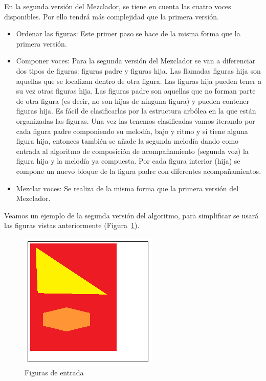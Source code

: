 En la segunda versión del Mezclador, se tiene en cuenta las cuatro voces disponibles. Por ello tendrá más complejidad que la primera versión.

\begin{itemize}
	\item Ordenar las figuras: Este primer paso se hace de la misma forma que la primera versión.

	\item Componer voces: Para la segunda versión del Mezclador se van a diferenciar dos tipos de figuras: figuras padre y figuras hija. Las llamadas figuras hija son aquellas que se localizan dentro de otra figura. Las figuras hija pueden tener a su vez otras figuras hija. Las figuras padre son aquellas que no forman parte de otra figura (es decir, no son hijas de ninguna figura) y pueden contener figuras hija. Es fácil de clasificarlas por la estructura arbólea en la que están organizadas las figuras.
Una vez las tenemos clasificadas vamos iterando por cada figura padre componiendo su melodía, bajo y ritmo y si tiene alguna figura hija, entonces también se añade la segunda melodía dando como entrada al algoritmo de composición de acompañamiento (segunda voz) la figura hija y la melodía ya compuesta. Por cada figura interior (hija) se compone un nuevo bloque de la figura padre con diferentes acompañamientos.

	\item Mezclar voces: Se realiza de la misma forma que la primera versión del Mezclador.

\end{itemize}

Veamos un ejemplo de la segunda versión del algoritmo, para simplificar se usará las figuras vistas anteriormente (Figura~\ref{fig:Figura0Mixer}).

		\begin{figure}[htbp]
		\centering
		\hspace*{0.0in}
		\includegraphics[scale=1]{graphics/simpletest5.png}
		\caption{Figuras de entrada}
		\label{fig:Figura0Mixer}
		\end{figure}

